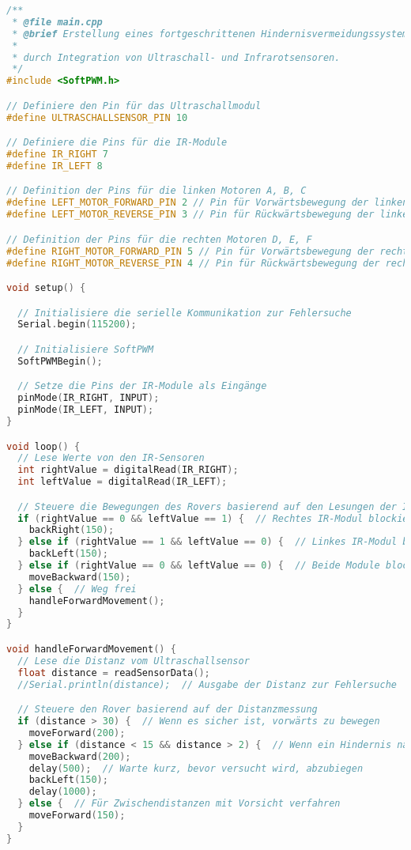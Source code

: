 \documentclass{vorlage-design-main}
\begin{document}
\newpage

\begin{lstlisting}[language={C++}]
/**
 * @file main.cpp
 * @brief Erstellung eines fortgeschrittenen Hindernisvermeidungssystems
 * 
 * durch Integration von Ultraschall- und Infrarotsensoren.
 */
#include <SoftPWM.h>

// Definiere den Pin für das Ultraschallmodul
#define ULTRASCHALLSENSOR_PIN 10

// Definiere die Pins für die IR-Module
#define IR_RIGHT 7
#define IR_LEFT 8

// Definition der Pins für die linken Motoren A, B, C
#define LEFT_MOTOR_FORWARD_PIN 2 // Pin für Vorwärtsbewegung der linken Motoren (A, B, C)
#define LEFT_MOTOR_REVERSE_PIN 3 // Pin für Rückwärtsbewegung der linken Motoren (A, B, C)

// Definition der Pins für die rechten Motoren D, E, F
#define RIGHT_MOTOR_FORWARD_PIN 5 // Pin für Vorwärtsbewegung der rechten Motoren (D, E, F)
#define RIGHT_MOTOR_REVERSE_PIN 4 // Pin für Rückwärtsbewegung der rechten Motoren (D, E, F)

void setup() {

  // Initialisiere die serielle Kommunikation zur Fehlersuche
  Serial.begin(115200);

  // Initialisiere SoftPWM
  SoftPWMBegin();

  // Setze die Pins der IR-Module als Eingänge
  pinMode(IR_RIGHT, INPUT);
  pinMode(IR_LEFT, INPUT);
}

void loop() {
  // Lese Werte von den IR-Sensoren
  int rightValue = digitalRead(IR_RIGHT);
  int leftValue = digitalRead(IR_LEFT);

  // Steuere die Bewegungen des Rovers basierend auf den Lesungen der IR-Sensoren
  if (rightValue == 0 && leftValue == 1) {  // Rechtes IR-Modul blockiert
    backRight(150);
  } else if (rightValue == 1 && leftValue == 0) {  // Linkes IR-Modul blockiert
    backLeft(150);
  } else if (rightValue == 0 && leftValue == 0) {  // Beide Module blockiert
    moveBackward(150);
  } else {  // Weg frei
    handleForwardMovement();
  }
}

void handleForwardMovement() {
  // Lese die Distanz vom Ultraschallsensor
  float distance = readSensorData();
  //Serial.println(distance);  // Ausgabe der Distanz zur Fehlersuche

  // Steuere den Rover basierend auf der Distanzmessung
  if (distance > 30) {  // Wenn es sicher ist, vorwärts zu bewegen
    moveForward(200);
  } else if (distance < 15 && distance > 2) {  // Wenn ein Hindernis nahe ist
    moveBackward(200);
    delay(500);  // Warte kurz, bevor versucht wird, abzubiegen
    backLeft(150);
    delay(1000);
  } else {  // Für Zwischendistanzen mit Vorsicht verfahren
    moveForward(150);
  }
}


\end{lstlisting}
\end{document}

